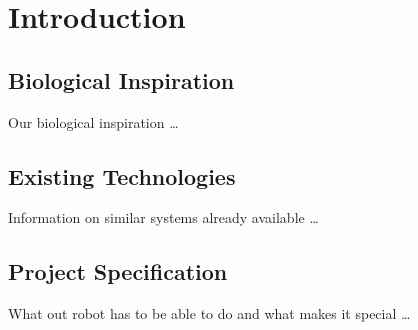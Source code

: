 \chapter{Introduction} \label{Chapter:Introduction}




\section{Biological Inspiration}
Our biological inspiration \dots

\section{Existing Technologies}
Information on similar systems already available \dots

\section{Project Specification}
What out robot has to be able to do and what makes it special \dots
